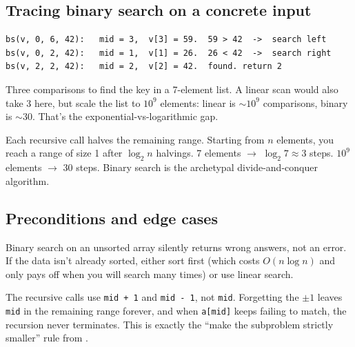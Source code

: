 \documentclass[11pt]{article}
\begin{document}
\subsection{Tracing binary search on a concrete input}

\begin{examplebox}
\begin{verbatim}
bs(v, 0, 6, 42):   mid = 3,  v[3] = 59.  59 > 42  ->  search left
bs(v, 0, 2, 42):   mid = 1,  v[1] = 26.  26 < 42  ->  search right
bs(v, 2, 2, 42):   mid = 2,  v[2] = 42.  found. return 2
\end{verbatim}
Three comparisons to find the key in a 7-element list. A linear scan
would also take 3 here, but scale the list to $10^9$ elements: linear
is $\sim 10^9$ comparisons, binary is $\sim 30$. That's the
exponential-vs-logarithmic gap.
\end{examplebox}

\begin{notebox}
Each recursive call halves the remaining range. Starting from $n$
elements, you reach a range of size 1 after $\log_2 n$ halvings. 7
elements $\to$ $\log_2 7 \approx 3$ steps. $10^9$ elements $\to$ 30
steps. Binary search is the archetypal divide-and-conquer algorithm.
\end{notebox}

\subsection{Preconditions and edge cases}

\begin{warnbox}
Binary search on an unsorted array silently returns wrong answers,
not an error. If the data isn't already sorted, either sort first
(which costs $O(n \log n)$ and only pays off when you will search
many times) or use linear search.
\end{warnbox}

\begin{warnbox}
The recursive calls use \texttt{mid + 1} and \texttt{mid - 1}, not
\texttt{mid}. Forgetting the $\pm 1$ leaves \texttt{mid} in the
remaining range forever, and when \texttt{a[mid]} keeps failing to
match, the recursion never terminates. This is exactly the ``make
the subproblem strictly smaller'' rule from .
\end{warnbox}
\end{document}
